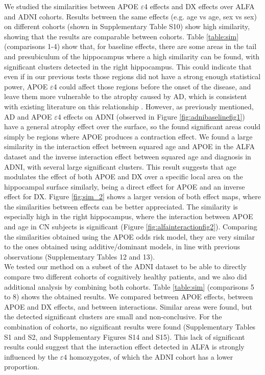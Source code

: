 We studied the similarities between APOE $\varepsilon$4 effects and DX effects over ALFA and ADNI cohorts. Results between the same effects (e.g. age vs age, sex vs sex) on different cohorts (shown in Supplementary Table S10) show high similarity, showing that the results are comparable between cohorts. Table \ref{table:sim} (comparisons 1-4) show that, for baseline effects, there are some areas in the tail and presubiculum of the hippocampus where a high similarity can be found, with significant clusters detected in the right hippocampus. This could indicate that even if in our previous tests those regions did not have a strong enough statistical power, APOE $\varepsilon$4 could affect those regions before the onset of the disease, and leave them more vulnerable to the atrophy caused by AD, which is consistent with existing literature on this relationship \cite{Wolk2010}. However, as previously mentioned, AD and APOE $\varepsilon$4 effects on ADNI (observed in Figure \ref{fig:adnibaselinefig1}) have a general atrophy effect over the surface, so the found significant areas could simply be regions where APOE produces a contraction effect. We found a large similarity in the interaction effect between squared age and APOE in the ALFA dataset and the inverse interaction effect between squared age and diagnosis in ADNI, with several large significant clusters. This result suggests that age modulates the effect of both APOE and DX over a specific local area on the hippocampal surface similarly, being a direct effect for APOE and an inverse effect for DX. Figure \ref{fig:sim_2} shows a larger version of both effect maps, where the similarities between effects can be better appreciated. The similarity is especially high in the right hippocampus, where the interaction between APOE and age in CN subjects is significant (Figure \ref{fig:alfainteractionfig2}). Comparing the similarities obtained using the APOE odds risk model, they are very similar to the ones obtained using additive/dominant models, in line with previous observations (Supplementary Tables 12 and 13).  \\ 

We tested our method on a subset of the ADNI dataset to be able to directly compare two different cohorts of cognitively healthy patients, and we also did additional analysis by combining both cohorts. Table \ref{table:sim} (comparisons 5 to 8) shows the obtained results. We compared between APOE effects, between APOE and DX effects, and between interactions. Similar areas were found, but the detected significant clusters are small and non-conclusive. For the combination of cohorts, no significant results were found (Supplementary Tables S1 and S2, and Supplementary Figures S14 and S15). This lack of significant results could suggest that the interaction effect detected in ALFA is strongly influenced by the $\varepsilon4$ homozygotes, of which the ADNI cohort has a lower proportion. \\ 

